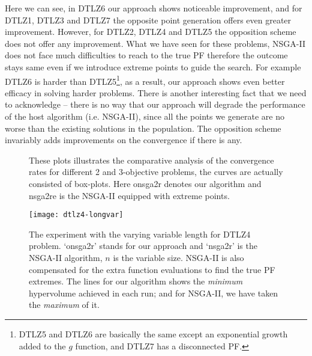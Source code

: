 \documentclass[journal]{IEEEtran}
\let\MYoriglatexcaption\caption
\renewcommand{\caption}[2][\relax]{\MYoriglatexcaption[#2]{#2}}
\begin{document}
Here we can see, in DTLZ6 our approach shows noticeable improvement, and for DTLZ1, DTLZ3 and DTLZ7 the opposite point generation offers even greater improvement. However, for DTLZ2, DTLZ4 and DTLZ5 the opposition scheme does not offer any improvement. What we have seen for these problems, NSGA-II does not face much difficulties to reach to the true PF therefore the outcome stays same even if we introduce extreme points to guide the search. For example DTLZ6 is harder than DTLZ5\footnote{DTLZ5 and DTLZ6 are basically the same except an exponential growth added to the \(g\) function, and DTLZ7 has a disconnected PF.}, as a result, our approach shows even better efficacy in solving harder problems. There is another interesting fact that we need to acknowledge -- there is no way that our approach will degrade the performance of the host algorithm (i.e. NSGA-II), since all the points we generate are no worse than the existing solutions in the population. The opposition scheme invariably adds improvements on the convergence if there is any. 

%
\begin{figure*}[pb!]
	\centering
	\hfill
		\caption{These plots illustrates the comparative analysis of the convergence rates for different 2 and 3-objective problems, the curves are actually consisted of box-plots. Here onsga2r denotes our algorithm and nsga2re is the NSGA-II equipped with extreme points.}
	\label{plot:nsga2re-hv}
\end{figure*}
%
\begin{figure}[!tp]
	\centering
	\texttt{[image: dtlz4-longvar]}
	\caption{The experiment with the varying variable length for DTLZ4 problem. `onsga2r' stands for our approach and `nsga2r' is the NSGA-II algorithm, \(n\) is the variable size. NSGA-II is also compensated for the extra function evaluations to find the true PF extremes. The lines for our algorithm shows the \textit{minimum} hypervolume achieved in each run; and for NSGA-II, we have taken the \textit{maximum} of it.}
	\label{plot:longvar}\vspace{-10.0pt}
\end{figure}
%
\end{document}
